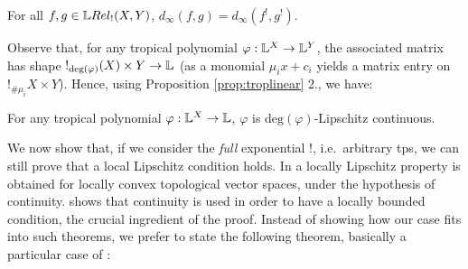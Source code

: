 \begin{proposition}
For all $f,g\in \LREL_{!}(X,Y)$, $d_{\infty}( f,g)=d_\infty(f^{!},g^{!})$.%
\end{proposition}



Observe that, for any tropical polynomial $\varphi:\mathbb{L}^{X}\to \mathbb{L}^{Y}$, the associated matrix has shape $!_{\mathrm{deg}(\varphi)}(X)\times Y\to \mathbb{L}$ (as a monomial $\mu_ix+c_{i}$ yields a matrix entry on $!_{\#\mu_i}X\times Y$). Hence, using Proposition \ref{prop:troplinear} 2., we have:
\begin{corollary}\label{prop:polylip}
For any tropical polynomial $\varphi:\mathbb{L}^{X}\to\mathbb{L}$, $\varphi$ is $\mathrm{deg}(\varphi)$-Lipschitz continuous.
\end{corollary}

We now show that, if we consider the \emph{full} exponential $!$, i.e.~arbitrary tps, we can still prove that a local Lipschitz condition holds. %
In \cite[Theorem 6.4]{Cobzas2017} a locally Lipschitz property is obtained for locally convex topological vector spaces, under the hypothesis of continuity. \cite[Proposition 6.5]{Cobzas2017} shows that continuity is used in order to have a locally bounded condition, the crucial ingredient of the proof.
Instead of showing how our case fits into such theorems, we prefer to state the following theorem, basically a particular case of \cite[Theorem 6.9, Lemma 6.10]{Cobzas2017}:

